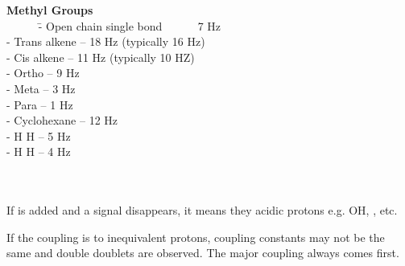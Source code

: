 \begin{tabbing}
\textbf{Methyl Groups}\\

  ~~~~~ \= - Open chain single bond ~~~~~ \= 7 Hz \\
  \> - Trans alkene              -- 18 Hz (typically 16 Hz) \\
  \> - Cis alkene                -- 11 Hz (typically 10 HZ) \\
  \> - Ortho                     -- 9 Hz \\
  \> - Meta                      -- 3 Hz \\
  \> - Para                      -- 1 Hz \\
  \> - Cyclohexane               -- 12 Hz \\
  \> - H H       -- 5 Hz \\
  \> - H H       -- 4 Hz \\\\\\
\end{tabbing}

If  is added and a signal disappears, it means they acidic protons e.g.
OH, , etc.

If the coupling is to inequivalent protons, coupling constants may not be the
same and double doublets are observed. The major coupling always comes first.





